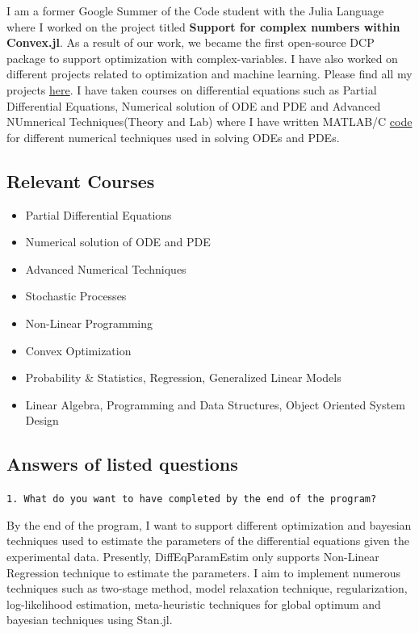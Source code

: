 \documentclass[11pt]{article}
\providecommand{\tightlist}{%
      \setlength{\itemsep}{0pt}\setlength{\parskip}{0pt}}
\begin{document}
I am a former Google Summer of the Code student with the Julia Language
where I worked on the project titled \textbf{Support for complex numbers
within Convex.jl}. As a result of our work, we became the first
open-source DCP package to support optimization with complex-variables.
I have also worked on different projects related to optimization and
machine learning. Please find all my projects
\href{https://drive.google.com/drive/folders/0B2oOdWdSJWa1RWRsQWdCZ25LUXc}{here}.
I have taken courses on differential equations such as Partial
Differential Equations, Numerical solution of ODE and PDE and Advanced
NUmnerical Techniques(Theory and Lab) where I have written MATLAB/C
\href{https://github.com/Ayush-iitkgp/Numerical-Solution-of-ODE-and-PDE}{code}
for different numerical techniques used in solving ODEs and PDEs.

\subsection{Relevant Courses}\label{relevant-courses}

\begin{itemize}
\tightlist
\item
  Partial Differential Equations
\item
  Numerical solution of ODE and PDE
\item
  Advanced Numerical Techniques
\item
  Stochastic Processes
\item
  Non-Linear Programming
\item
  Convex Optimization
\item
  Probability \& Statistics, Regression, Generalized Linear Models
\item
  Linear Algebra, Programming and Data Structures, Object Oriented
  System Design
\end{itemize}

\subsection{Answers of listed
questions}\label{answers-of-listed-questions}

\texttt{1.\ What\ do\ you\ want\ to\ have\ completed\ by\ the\ end\ of\ the\ program?}

By the end of the program, I want to support different optimization and
bayesian techniques used to estimate the parameters of the differential
equations given the experimental data. Presently, DiffEqParamEstim only
supports Non-Linear Regression technique to estimate the parameters. I
aim to implement numerous techniques such as two-stage method, model
relaxation technique, regularization, log-likelihood estimation,
meta-heuristic techniques for global optimum and bayesian techniques
using Stan.jl.
\end{document}
